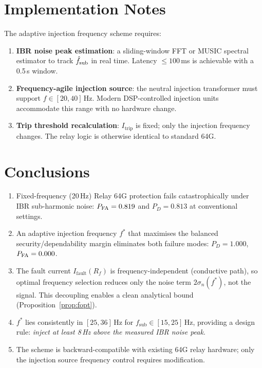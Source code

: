 \documentclass[11pt,a4paper]{article}
\newcommand{\Ifault}{I_{\mathrm{fault}}}
\newcommand{\Itrip}{I_{\mathrm{trip}}}
\newcommand{\sigman}{\sigma_n}
\newcommand{\fopt}{f^*}
\newcommand{\fsub}{f_{\mathrm{sub}}}
\begin{document}
\section{Implementation Notes}
\label{sec:impl}

The adaptive injection frequency scheme requires:
\begin{enumerate}
  \item \textbf{IBR noise peak estimation}: a sliding-window FFT or MUSIC
        spectral estimator to track $\hat{f}_{\rm sub}$ in real time.
        Latency $\leq 100$\,ms is achievable with a 0.5\,s window.
  \item \textbf{Frequency-agile injection source}: the neutral injection
        transformer must support $f \in [20, 40]$\,Hz.  Modern DSP-controlled
        injection units accommodate this range with no hardware change.
  \item \textbf{Trip threshold recalculation}: $\Itrip$ is fixed; only the
        injection frequency changes.  The relay logic is otherwise identical to
        standard 64G.
\end{enumerate}

\section{Conclusions}
\label{sec:conclusions}

\begin{enumerate}
  \item Fixed-frequency (20\,Hz) Relay 64G protection fails catastrophically
        under IBR sub-harmonic noise: $P_{\rm FA} = 0.819$ and $P_D = 0.813$
        at conventional settings.

  \item An adaptive injection frequency $\fopt$ that maximises the balanced
        security/dependability margin eliminates both failure modes:
        $P_D = 1.000$, $P_{\rm FA} = 0.000$.

  \item The fault current $\Ifault(R_f)$ is frequency-independent (conductive
        path), so optimal frequency selection reduces only the noise term
        $2\sigman(\fopt)$, not the signal.  This decoupling enables a clean
        analytical bound (Proposition~\ref{prop:fopt}).

  \item $\fopt$ lies consistently in $[25, 36]$\,Hz for $\fsub \in [15, 25]$\,Hz,
        providing a design rule: \emph{inject at least 8\,Hz above the
        measured IBR noise peak}.

  \item The scheme is backward-compatible with existing 64G relay hardware;
        only the injection source frequency control requires modification.
\end{enumerate}
\end{document}
